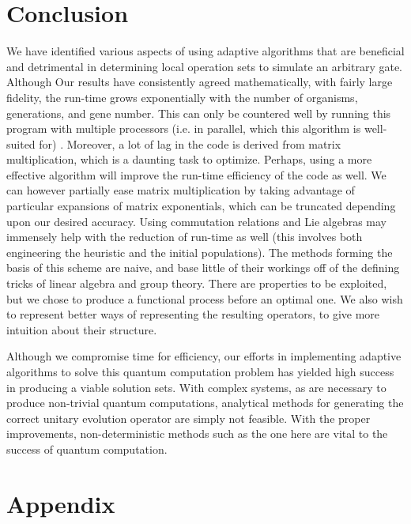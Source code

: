 \documentclass[11pt,twocolumn]{article}
\begin{document}
	\section{Conclusion}

We have identified various aspects of using adaptive algorithms that are beneficial and detrimental in determining local operation sets to simulate an arbitrary gate. Although Our results have consistently agreed mathematically, with fairly large fidelity, the run-time grows exponentially with the number of organisms, generations, and gene number. This can only be countered well by running this program with multiple processors (i.e. in parallel, which this algorithm is well-suited for) \cite{umbarkar}. Moreover, a lot of lag in the code is derived from matrix multiplication, which is a daunting task to optimize. Perhaps, using a more effective algorithm will improve the run-time efficiency of the code as well. We can however partially ease matrix multiplication by taking advantage of particular expansions of matrix exponentials, which can be truncated depending upon our desired accuracy. Using commutation relations and Lie algebras may immensely help with the reduction of run-time as well (this involves both engineering the heuristic and the initial populations). The methods forming the basis of this scheme are naive, and base little of their workings off of the defining tricks of linear algebra and group theory. There are properties to be exploited, but we chose to produce a functional process before an optimal one. We also wish to represent better ways of representing the resulting operators, to give more intuition about their structure.

Although we compromise time for efficiency, our efforts in implementing adaptive algorithms to solve this quantum computation problem has yielded high success in producing a viable solution sets. With complex systems, as are necessary to produce non-trivial quantum computations, analytical methods for generating the correct unitary evolution operator are simply not feasible. With the proper improvements, non-deterministic methods such as the one here are vital to the success of quantum computation. 


	\section{Appendix} \label{appendix}
\end{document}
